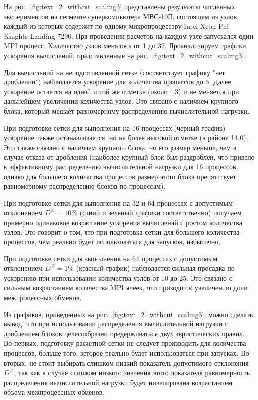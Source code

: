 На рис.~\ref{fig:text_2_withcut_scaling3} представлены результаты численных экспериментов на сегменте суперкомпьютера МВС-10П, состоящем из узлов, каждый из которых содержит по одному микропроцессору Intel Xeon Phi Knights Landing 7290.
При проведении расчетов на каждом узле запускался один MPI процесс.
Количество узлов менялось от 1 до 32.
Проанализируем графики ускорения вычислений, представленные на рис.~\ref{fig:text_2_withcut_scaling3}.

Для вычислений на неподготовленной сетке (соответствует графику "нет дроблений") наблюдается ускорение для количества процессов до 5.
Далее ускорение остается на одной и той же отметке (около 4,3) и не меняется при дальнейшем увеличении количества узлов.
Это связано с наличием крупного блока, который мешает равномерному распределению вычислительной нагрузки.

При подготовке сетки для выполнения на 16 процессах (черный график) ускорение также останавливается, но на более высокой отметке (в районе 14,0).
Это также связано с наличием крупного блока, но его размер меньше, чем в случае отказа от дроблений (наиболее крупный блок был раздроблен, что привело к эффективному распределению вычислительной нагрузки для 16 процессов, однако для большего количества процессов размер этого блока препятствует равномерному распределению блоков по процессам).

При подготовке сетки для выполнения на 32 и 64 процессах с допустимым отклонением $D^{\%} = 10\%$ (синий и зеленый графики соответственно) получаем примерно одинаковое возрастание ускорения вычислений с ростом количества узлов.
Это говорит о том, что при подготовка сетки для большего количества процессов, чем реально будет использоваться для запусков, избыточно.

При подготовке сетки для выполнения на 64 процессах с допустимым отклонением $D^{\%} = 1\%$ (красный график) наблюдается сильная просадка по ускорению при использовании количества узлов от 10 до 25.
Это связано с сильным возрастанием количества MPI ячеек, что приводит к увеличению доли межпроцессных обменов.

Из графиков, приведенных на рис.~\ref{fig:text_2_withcut_scaling3}, можно сделать вывод, что при использовании распределения вычислительной нагрузки с дроблением блоков целесообразно предерживаться двух эвристических правил.
Во-первых, подготовку расчетной сетки не следует производить для количества процессов, больше того, которое реально будет использоваться при запусках.
Во-вторых, не стоит выбирать слишком низкий показатель допустимого отклонения $D^{\%}$, так как в случае слишком низкого значения этого показателя равномерность распределения вычислительной нагрузки будет нивелирована возрастанием объема межпроцессных обменов.
